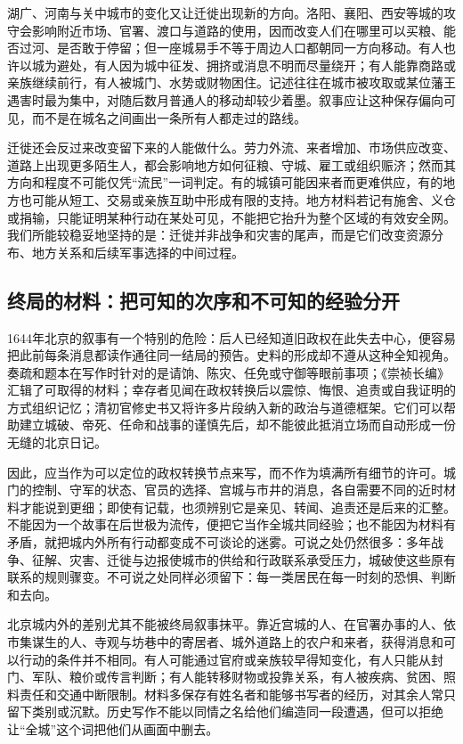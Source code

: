 湖广、河南与关中城市的变化又让迁徙出现新的方向。洛阳、襄阳、西安等城的攻守会影响附近市场、官署、渡口与道路的使用，因而改变人们在哪里可以买粮、能否过河、是否敢于停留；但一座城易手不等于周边人口都朝同一方向移动。有人也许以城为避处，有人因为城中征发、拥挤或消息不明而尽量绕开；有人能靠商路或亲族继续前行，有人被城门、水势或财物困住。记述往往在城市被攻取或某位藩王遇害时最为集中，对随后数月普通人的移动却较少着墨。叙事应让这种保存偏向可见，而不是在城名之间画出一条所有人都走过的路线。

迁徙还会反过来改变留下来的人能做什么。劳力外流、来者增加、市场供应改变、道路上出现更多陌生人，都会影响地方如何征粮、守城、雇工或组织赈济；然而其方向和程度不可能仅凭“流民”一词判定。有的城镇可能因来者而更难供应，有的地方也可能从短工、交易或亲族互助中形成有限的支持。地方材料若记有施舍、义仓或捐输，只能证明某种行动在某处可见，不能把它抬升为整个区域的有效安全网。我们所能较稳妥地坚持的是：迁徙并非战争和灾害的尾声，而是它们改变资源分布、地方关系和后续军事选择的中间过程。

\subsection{终局的材料：把可知的次序和不可知的经验分开}

1644年北京的叙事有一个特别的危险：后人已经知道旧政权在此失去中心，便容易把此前每条消息都读作通往同一结局的预告。史料的形成却不遵从这种全知视角。奏疏和题本在写作时针对的是请饷、陈灾、任免或守御等眼前事项；《崇祯长编》汇辑了可取得的材料；幸存者见闻在政权转换后以震惊、悔恨、追责或自我证明的方式组织记忆；清初官修史书又将许多片段纳入新的政治与道德框架。它们可以帮助建立城破、帝死、任命和战事的谨慎先后，却不能彼此抵消立场而自动形成一份无缝的北京日记。

因此，应当作为可以定位的政权转换节点来写，而不作为填满所有细节的许可。城门的控制、守军的状态、官员的选择、宫城与市井的消息，各自需要不同的近时材料才能说到更细；即使有记载，也须辨别它是亲见、转闻、追责还是后来的汇整。不能因为一个故事在后世极为流传，便把它当作全城共同经验；也不能因为材料有矛盾，就把城内外所有行动都变成不可谈论的迷雾。可说之处仍然很多：多年战争、征解、灾害、迁徙与边报使城市的供给和行政联系承受压力，城破使这些原有联系的规则骤变。不可说之处同样必须留下：每一类居民在每一时刻的恐惧、判断和去向。

北京城内外的差别尤其不能被终局叙事抹平。靠近宫城的人、在官署办事的人、依市集谋生的人、寺观与坊巷中的寄居者、城外道路上的农户和来者，获得消息和可以行动的条件并不相同。有人可能通过官府或亲族较早得知变化，有人只能从封门、军队、粮价或传言判断；有人能转移财物或投靠关系，有人被疾病、贫困、照料责任和交通中断限制。材料多保存有姓名者和能够书写者的经历，对其余人常只留下类别或沉默。历史写作不能以同情之名给他们编造同一段遭遇，但可以拒绝让“全城”这个词把他们从画面中删去。

